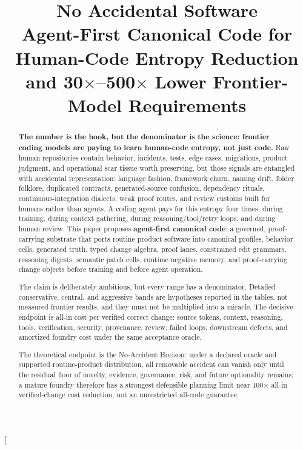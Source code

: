 \documentclass[conference]{IEEEtran}
\title{\textbf{No Accidental Software}\\
Agent-First Canonical Code for Human-Code Entropy Reduction and 30$\times$--500$\times$ Lower Frontier-Model Requirements}
\author{
\IEEEauthorblockN{Jepson Taylor}
\IEEEauthorblockA{NeverHuman Research}
}
\begin{document}
\twocolumn[
\begin{@twocolumnfalse}
\maketitle

\begin{abstract}
\textbf{The number is the hook, but the denominator is the science: frontier coding models are paying to learn human-code entropy, not just code.} Raw human repositories contain behavior, incidents, tests, edge cases, migrations, product judgment, and operational scar tissue worth preserving, but those signals are entangled with accidental representation: language fashion, framework churn, naming drift, folder folklore, duplicated contracts, generated-source confusion, dependency rituals, continuous-integration dialects, weak proof routes, and review customs built for humans rather than agents. A coding agent pays for this entropy four times: during training, during context gathering, during reasoning/tool/retry loops, and during human review. This paper proposes \textbf{agent-first canonical code}: a governed, proof-carrying substrate that ports routine product software into canonical profiles, behavior cells, generated truth, typed change algebra, proof lanes, constrained edit grammars, reasoning digests, semantic patch cells, runtime negative memory, and proof-carrying change objects before training and before agent operation.

The claim is deliberately ambitious, but every range has a denominator. Detailed conservative, central, and aggressive bands are hypotheses reported in the tables, not measured frontier results, and they must not be multiplied into a miracle. The decisive endpoint is all-in cost per verified correct change: source tokens, context, reasoning, tools, verification, security, provenance, review, failed loops, downstream defects, and amortized foundry cost under the same acceptance oracle.

The theoretical endpoint is the No-Accident Horizon: under a declared oracle and supported routine-product distribution, all removable accident can vanish only until the residual floor of novelty, evidence, governance, risk, and future optionality remains; a mature foundry therefore has a strongest defensible planning limit near 100$\times$ all-in verified-change cost reduction, not an unrestricted all-code guarantee.


\end{abstract}
\end{@twocolumnfalse}
\end{document}
